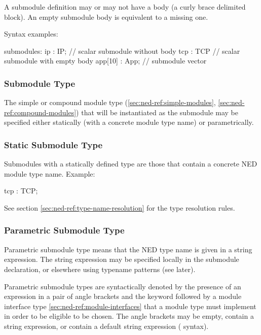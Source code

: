 A submodule definition may or may not have a body (a curly brace
delimited block). An empty submodule body is equivalent to a
missing one.

Syntax examples:
\begin{ned}
submodules:
    ip : IP;         // scalar submodule without body
    tcp : TCP {}     // scalar submodule with empty body
    app[10] : App;   // submodule vector
\end{ned}


\subsubsection{Submodule Type}
\label{sec:ned-ref:submodule-type}

The simple or compound module type (\ref{sec:ned-ref:simple-modules},
\ref{sec:ned-ref:compound-modules}) that will be instantiated as the
submodule may be specified either statically (with a concrete module type
name) or parametrically.


\subsubsection{Static Submodule Type}
\label{sec:ned-ref:static-submodule-type}

Submodules with a statically defined type are those that contain a concrete
NED module type name. Example:

\begin{ned}
tcp : TCP;
\end{ned}

See section \ref{sec:ned-ref:type-name-resolution} for the type resolution
rules.


\subsubsection{Parametric Submodule Type}
\label{sec:ned-ref:parametric-submodule-type}

Parametric submodule type means that the NED type name is given in a string
expression. The string expression may be specified locally in the submodule
declaration, or elsewhere using typename patterns (see later).

Parametric submodule types are syntactically denoted by the presence of an
expression in a pair of angle brackets and the  keyword
followed by a module interface type \ref{sec:ned-ref:module-interfaces}
that a module type must implement in order to be eligible to be chosen.
The angle brackets may be empty, contain a string expression, or contain a
default string expression ( syntax).

